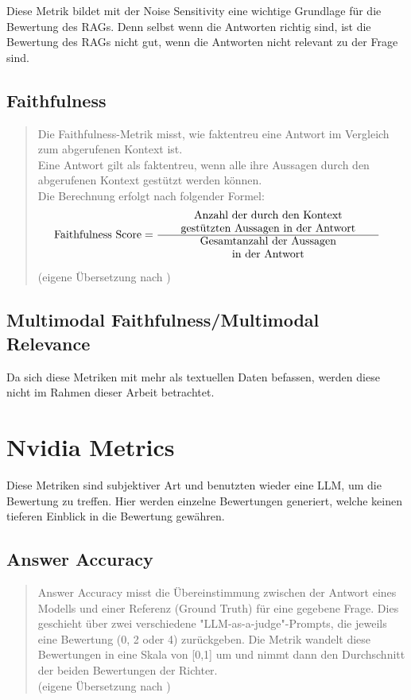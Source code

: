 Diese Metrik bildet mit der Noise Sensitivity eine wichtige Grundlage für die Bewertung des RAGs.
Denn selbst wenn die Antworten richtig sind, ist die Bewertung des RAGs nicht gut, wenn die Antworten nicht relevant zu der Frage sind.

\subsection{Faithfulness}
\begin{quote}
Die Faithfulness-Metrik misst, wie faktentreu eine Antwort im Vergleich zum abgerufenen Kontext ist.\\

Eine Antwort gilt als faktentreu, wenn alle ihre Aussagen durch den abgerufenen Kontext gestützt werden können.\\

Die Berechnung erfolgt nach folgender Formel:
\begin{align}
  \text{Faithfulness Score} 
    &= \frac{
        \parbox{7cm}{\centering Anzahl der durch den Kontext\\ gestützten Aussagen in der Antwort}
      }{
        \parbox{7cm}{\centering Gesamtanzahl der Aussagen\\ in der Antwort}
      }
  \end{align}

(eigene Übersetzung nach \cite{ragas_faithfulness})
\end{quote}
\subsection{Multimodal Faithfulness/Multimodal Relevance}
Da sich diese Metriken mit mehr als textuellen Daten befassen, werden diese nicht im Rahmen dieser Arbeit betrachtet.


\section{Nvidia Metrics}
Diese Metriken sind subjektiver Art und benutzten wieder eine LLM, um die Bewertung zu treffen.
Hier werden einzelne Bewertungen generiert, welche keinen tieferen Einblick in die Bewertung gewähren.

\subsection{Answer Accuracy}
\begin{quote}
Answer Accuracy misst die Übereinstimmung zwischen der Antwort eines Modells und einer Referenz (Ground Truth) für eine gegebene Frage. Dies geschieht über zwei verschiedene "LLM-as-a-judge"-Prompts, die jeweils eine Bewertung (0, 2 oder 4) zurückgeben. Die Metrik wandelt diese Bewertungen in eine Skala von [0,1] um und nimmt dann den Durchschnitt der beiden Bewertungen der Richter.
\\
(eigene Übersetzung nach \cite{ragas_nvidia_metrics})
\end{quote}

